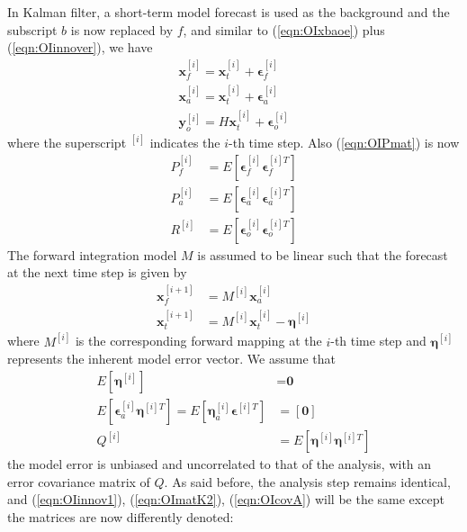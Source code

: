 In Kalman filter, a short-term model forecast is used as the background and the subscript $b$ is now replaced by $f$, and similar to (\ref{eqn:OIxbaoe}) plus (\ref{eqn:OIinnover}), we have
\begin{subequations}
\begin{align}
\textbf{x}_f^{[i]} = \textbf{x}_t^{[i]} + \bm{\epsilon}_f^{[i]} \\
\textbf{x}_a^{[i]} = \textbf{x}_t^{[i]} + \bm{\epsilon}_a^{[i]} \\
\textbf{y}_o^{[i]} = H\textbf{x}_t^{[i]} + \bm{\epsilon}_o^{[i]}    
\end{align}    
\end{subequations}
where the superscript $^{[i]}$ indicates the $i$-th time step. Also (\ref{eqn:OIPmat}) is now
\begin{subequations}
\begin{align}
P_f^{[i]} &= E[\bm{\epsilon}_f^{[i]}\bm{\epsilon}_f^{[i]T}] \\
P_a^{[i]} &= E[\bm{\epsilon}_a^{[i]}\bm{\epsilon}_a^{[i]T}] \\
R^{[i]} &= E[\bm{\epsilon}_o^{[i]}\bm{\epsilon}_o^{[i]T}]    
\end{align}
\end{subequations}
The forward integration model $M$ is assumed to be linear such that the forecast at the next time step is given by
\begin{subequations}
\label{eqn:forecastKalman}
\begin{align}
\textbf{x}_f^{[i+1]} &= M^{[i]}\textbf{x}_a^{[i]} \label{eqn:xaMxf} \\
\textbf{x}_t^{[i+1]} &= M^{[i]}\textbf{x}_t^{[i]} - \bm{\eta}^{[i]}
\end{align}
\end{subequations}
where $M^{[i]}$ is the corresponding forward mapping at the $i$-th time step and $\bm{\eta}^{[i]}$ represents the inherent model error vector. We assume that
\begin{subequations}
\begin{align}
E[\bm{\eta}^{[i]}] &= \textbf{0} \\
E[\bm{\epsilon}_a^{[i]}\bm{\eta}^{[i]T}] = E[\bm{\eta}_a^{[i]}\bm{\epsilon}^{[i]T}] &= [\textbf{0}] \label{eqn:modelanluncorr}\\
Q^{[i]} &= E[\bm{\eta}^{[i]}\bm{\eta}^{[i]T}]
\end{align}   
\end{subequations}
the model error is unbiased and uncorrelated to that of the analysis, with an error covariance matrix of $Q$. As said before, the analysis step remains identical, and (\ref{eqn:OIinnov1}), (\ref{eqn:OImatK2}), (\ref{eqn:OIcovA}) will be the same except the matrices are now differently denoted:
